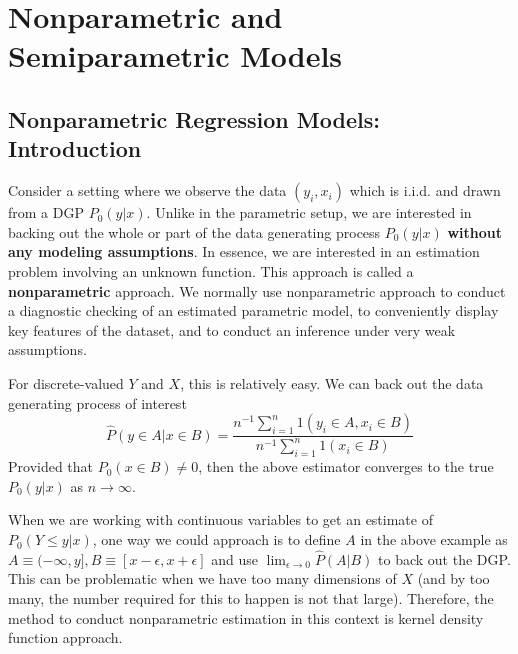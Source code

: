 
\chapter{Nonparametric and Semiparametric Models}
\section{Nonparametric Regression Models: Introduction}
Consider a setting where we observe the data $(y_i,x_i)$ which is i.i.d. and drawn from a DGP $P_0(y|x)$. Unlike in the parametric setup, we are interested in backing out the whole or part of the data generating process $P_0(y|x)$ \textbf{without any modeling assumptions}. In essence, we are interested in an estimation problem involving an unknown function. This approach is called a \textbf{nonparametric} approach. We normally use nonparametric approach to conduct a diagnostic checking of an estimated parametric model, to conveniently display key features of the dataset, and to conduct an inference under very weak assumptions. \par
For discrete-valued $Y$ and $X$, this is relatively easy. We can back out the data generating process of interest
\[
\hat{P}(y\in A| x\in B)=\frac{n^{-1}\sum_{i=1}^n1(y_i\in A, x_i\in B) }{n^{-1}\sum_{i=1}^n1(x_i\in B)}
\]
Provided that $P_0(x\in B)\neq 0$, then the above estimator converges to the true $P_0(y|x)$ as $n\to\infty$.
\par
When we are working with continuous variables to get an estimate of $P_0(Y\leq y|x)$, one way we could approach is to define $A$ in the above example as $A\equiv (-\infty, y], B\equiv[x-\epsilon, x+\epsilon]$ and use $\lim_{\epsilon\to0}\hat{P}(A|B)$ to back out the DGP. This can be problematic when we have too many dimensions of $X$ (and by too many, the number required for this to happen is not that large). Therefore, the method to conduct nonparametric estimation in this context is kernel density function approach. 
